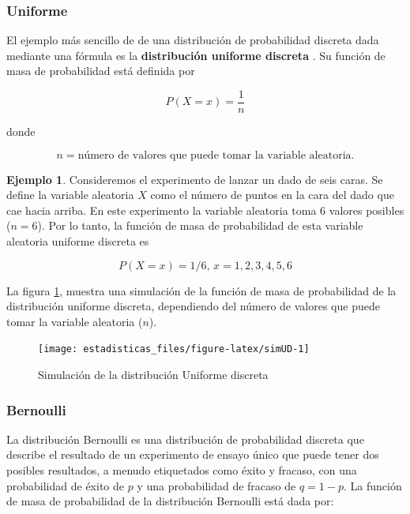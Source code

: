 \documentclass[
  11pt,
]{book}
\theoremstyle{definition}
\theoremstyle{definition}
\newtheorem{example}{Ejemplo}[chapter]
\theoremstyle{definition}
\theoremstyle{definition}
\theoremstyle{remark}
\begin{document}
\subsubsection{Uniforme}\label{uniforme}

El ejemplo más sencillo de de una distribución de probabilidad discreta dada mediante una fórmula es la \textbf{distribución uniforme discreta} \citep[página 191]{anderson}. Su función de masa de probabilidad está definida por

\begin{equation}
P(X=x) = \dfrac{1}{n}
\label{eq:uniformediscreta}
\end{equation}

donde

\[n = \text{número de valores que puede tomar la variable aleatoria.}\]

\begin{example}
Consideremos el experimento de lanzar un dado de seis caras. Se define la variable aleatoria \(X\) como el número de puntos en la cara del dado que cae hacia arriba. En este experimento la variable aleatoria toma 6 valores posibles (\(n = 6\)). Por lo tanto, la función de masa de probabilidad de esta variable aleatoria uniforme discreta es

\[P(X = x)=1/6 \text{, } x = 1,2,3,4,5,6\]
\end{example}

La figura \ref{fig:simUD}, muestra una simulación de la función de masa de probabilidad de la distribución uniforme discreta, dependiendo del número de valores que puede tomar la variable aleatoria (\(n\)).

\begin{figure}

{\centering \texttt{[image: estadisticas\_files/figure-latex/simUD-1]} 

}

\caption{Simulación de la distribución Uniforme discreta}\label{fig:simUD}
\end{figure}

\subsubsection{Bernoulli}\label{bernoulli}

La distribución Bernoulli es una distribución de probabilidad discreta que describe el resultado de un experimento de ensayo único que puede tener dos posibles resultados, a menudo etiquetados como éxito y fracaso, con una probabilidad de éxito de \(p\) y una probabilidad de fracaso de \(q = 1 - p\). La función de masa de probabilidad de la distribución Bernoulli está dada por:
\end{document}
